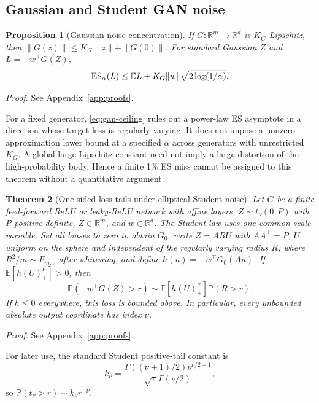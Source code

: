 \documentclass[11pt]{article}
\newtheorem{theorem}{Theorem}[section]
\newtheorem{proposition}[theorem]{Proposition}
\theoremstyle{definition}\newtheorem{definition}[theorem]{Definition}
\theoremstyle{remark}\newtheorem{remark}[theorem]{Remark}
\newcommand{\E}{\mathbb E}\newcommand{\Prob}{\mathbb P}\newcommand{\R}{\mathbb R}
\begin{document}
\subsection{Gaussian and Student GAN noise}
\begin{proposition}[Gaussian-noise concentration]\label{prop:gan}
If $G:\R^m\to\R^d$ is $K_G$-Lipschitz, then $\|G(z)\|\le K_G\|z\|+\|G(0)\|$. For standard Gaussian $Z$ and $L=-w^\top G(Z)$,
\begin{equation}\label{eq:gan-ceiling}
\ES_\alpha(L)\le\E L+K_G\|w\|\sqrt{2\log(1/\alpha)}.
\end{equation}
\end{proposition}
\noindent\emph{Proof.} See Appendix~\ref{app:proofs}.

For a fixed generator, \eqref{eq:gan-ceiling} rules out a power-law ES asymptote in a direction whose target loss is regularly varying. It does not impose a nonzero approximation lower bound at a specified $\alpha$ across generators with unrestricted $K_G$. A global large Lipschitz constant need not imply a large distortion of the high-probability body. Hence a finite 1\% ES miss cannot be assigned to this theorem without a quantitative argument.

\begin{theorem}[One-sided loss tails under elliptical Student noise]\label{thm:shared}
Let $G$ be a finite feed-forward ReLU or leaky-ReLU network with affine layers, $Z\sim t_\nu(0,P)$ with $P$ positive definite, $Z\in\R^m$, and $w\in\R^d$. The Student law uses one common scale variable. Set all biases to zero to obtain $G_0$, write $Z=ARU$ with $AA^\top=P$, $U$ uniform on the sphere and independent of the regularly varying radius $R$, where $R^2/m\sim F_{m,\nu}$ after whitening, and define $h(u)=-w^\top G_0(Au)$. If $\E[h(U)_+^\nu]>0$, then
\begin{equation}\label{eq:one-sided-relu}
\Prob(-w^\top G(Z)>r)\sim\E[h(U)_+^\nu]\Prob(R>r).
\end{equation}
If $h\le0$ everywhere, this loss is bounded above. In particular, every unbounded absolute output coordinate has index $\nu$.
\end{theorem}
\noindent\emph{Proof.} See Appendix~\ref{app:proofs}.

For later use, the standard Student positive-tail constant is
\begin{equation}\label{eq:constant}
k_\nu=\frac{\Gamma((\nu+1)/2)\nu^{\nu/2-1}}{\sqrt\pi\Gamma(\nu/2)},
\end{equation}
so $\Prob(t_\nu>r)\sim k_\nu r^{-\nu}$.
\end{document}
